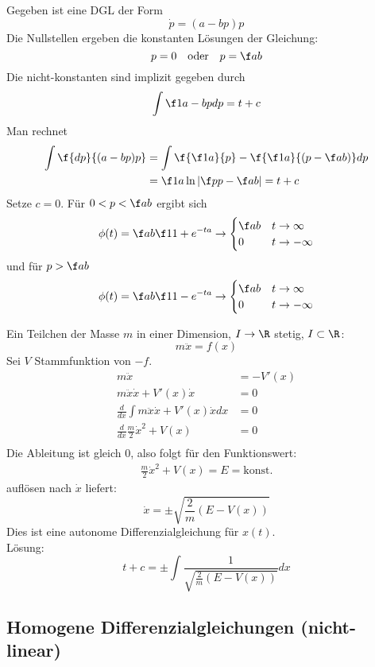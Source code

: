 \documentclass{mycourse}
\begin{document}
\begin{ex*}
	Gegeben ist eine DGL der Form
	\[
		\dot p = (a-bp)p
	\]
	Die Nullstellen ergeben die konstanten Lösungen der Gleichung:
	\[
		p = 0 \quad \text{oder} \quad p = \f ab
	\]
	Die nicht-konstanten sind implizit gegeben durch
	\[
		\int \f 1{a-bp}dp = t +c
	\]
	Man rechnet
	\begin{align*}
		\int \f {dp}{(a-bp)p} &= \int \f {\f 1a}{p} - \f {\f 1a}{(p-\f ab)}dp\\
							  &= \f 1a \ln \left| \f p{p-\f ab}\right| = t +c
	\end{align*}
	Setze $c=0$.
	Für $0<p<\f ab$ ergibt sich
	\[
		\phi(t) = \f ab \f 1{1+e^{-ta}} \to \begin{cases} \f ab & t\to \infty \\ 0 & t\to -\infty\end{cases}
	\]
	und für $p> \f ab$
	\[
		\phi(t) = \f ab \f 1{1-e^{-ta}} \to \begin{cases}\f ab & t \to \infty\\0 & t\to -\infty\end{cases}
	\]
\end{ex*}

\begin{ex*}

Ein Teilchen der Masse $m$ in einer Dimension, $I\to \R$ stetig, $I\subset \R$:
\[
m\ddot x=f(x)
\]
Sei $V$ Stammfunktion von $-f$.
\begin{align*}
m\ddot x &= -V'(x) \\
m\ddot x \dot x + V'(x)\dot x &= 0 \\
\frac d{dx} \int m \ddot x\dot x + V'(x)\dot xdx &= 0\\
\frac d{dx} \frac m2 \dot x^2 + V(x) &= 0\\
\end{align*}
Die Ableitung ist gleich $0$, also folgt für den Funktionswert:
\begin{align*}
\frac m2 \dot x^2 + V(x) = E = \text{konst.}
\end{align*}
auflösen nach $\dot x$ liefert:
\[
\dot x = \pm\sqrt{\frac 2m (E-V(x))}
\]
Dies ist eine autonome Differenzialgleichung für $x(t)$.\\
Lösung:\\
\[
t+c = \pm \int \frac{1}{\sqrt{\frac{2}{m}(E-V(x))}}dx
\]
\end{ex*}


\subsection{Homogene Differenzialgleichungen (nicht-linear)}
\end{document}
